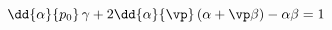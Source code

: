 \begin{equation}\label{jac}
 \dd{\alpha}{p_0}\, \gamma + 2 \dd{\alpha}{\vp}\, (\alpha + \vp\beta) - \alpha\beta  = 1
\end{equation}

